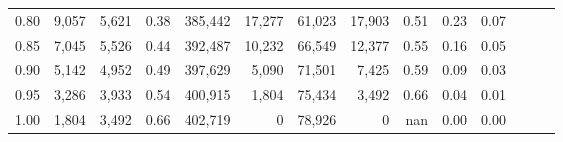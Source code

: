 \begin{tabular}{rrrrrrrrrrrrrr}
0.80 &   9,057 &  5,621 &  0.38 &  385,442 &   17,277 &  61,023 &  17,903 &  0.51 &  0.23 &      0.07 \\
0.85 &   7,045 &  5,526 &  0.44 &  392,487 &   10,232 &  66,549 &  12,377 &  0.55 &  0.16 &      0.05 \\
0.90 &   5,142 &  4,952 &  0.49 &  397,629 &    5,090 &  71,501 &   7,425 &  0.59 &  0.09 &      0.03 \\
0.95 &   3,286 &  3,933 &  0.54 &  400,915 &    1,804 &  75,434 &   3,492 &  0.66 &  0.04 &      0.01 \\
1.00 &   1,804 &  3,492 &  0.66 &  402,719 &        0 &  78,926 &       0 &   nan &  0.00 &      0.00 \\
\bottomrule
\end{tabular}

